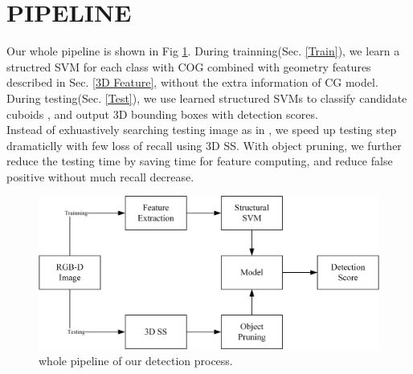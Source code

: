 \documentclass[english]{ccdconf}
\begin{document}
\section{PIPELINE}
Our whole pipeline is shown in Fig \ref{pipeline}. During trainning(Sec. \ref{Train}), we learn a structred SVM for each class with COG combined with geometry features described in Sec. \ref{3D Feature}, without the extra information of CG model. During testing(Sec. \ref{Test}), we use learned structured SVMs to classify candidate cuboids , and output 3D bounding boxes with detection scores.\\
Instead of exhuastively searching testing image as in \cite{ren2016three}, we speed up testing step dramaticlly with few loss of recall using 3D SS. With object pruning, we further reduce the testing time by saving time for feature computing, and reduce false positive without much recall decrease.
\begin{figure}
  \centering
  \includegraphics[width=\hsize]{3/pipeline.eps}
  \caption{whole pipeline of our detection process.}
  \label{pipeline}
\end{figure}
\end{document}
